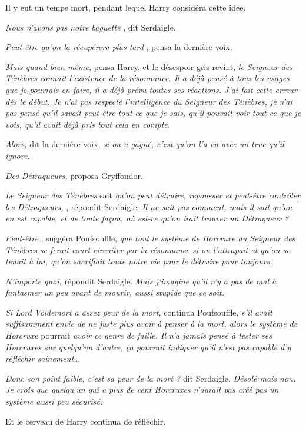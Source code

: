 Il y eut un temps mort, pendant lequel Harry considéra cette idée.

\emph{Nous n'avons pas notre baguette} , dit Serdaigle.

\emph{Peut-être qu'on la récupérera plus tard} , pensa la dernière voix.

\emph{Mais quand bien même,}  pensa Harry, et le désespoir gris revint, \emph{le Seigneur des Ténèbres connait l'existence de la résonnance. Il a déjà pensé à tous les usages que je pourrais en faire, il a déjà prévu toutes ses réactions. J'ai fait cette erreur dès le début. Je n'ai pas respecté l'intelligence du Seigneur des Ténèbres, je n'ai pas pensé qu'il savait peut-être tout ce que je sais, qu'il pouvait voir tout ce que je vois, qu'il avait déjà pris tout cela en compte.} 

\emph{Alors,}  dit la dernière voix, \emph{si on a gagné, c'est qu'on l'a eu avec un truc qu'il ignore.} 

\emph{Des Détraqueurs,}  proposa Gryffondor.

\emph{Le Seigneur des Ténèbres} sait \emph{qu'on peut détruire, repousser et peut-être contrôler les Détraqueurs,} , répondit Serdaigle. \emph{Il ne sait pas comment, mais il sait qu'on en est capable, et de toute façon, où est-ce qu'on irait trouver un Détraqueur ?} 

\emph{Peut-être} , suggéra Poufsouffle, \emph{que tout le système de Horcruxe du Seigneur des Ténèbres se ferait court-circuiter par la résonnance si on l'attrapait et qu'on se tenait à lui, qu'on sacrifiait toute notre vie pour le détruire pour toujours.} 

\emph{N'importe quoi,}  répondit Serdaigle. \emph{Mais j'imagine qu'il n'y a pas de mal à fantasmer un peu avant de mourir, aussi stupide que ce soit.} 

\emph{Si Lord Voldemort a assez peur de la mort,}  continua Poufsouffle, \emph{s'il avait suffisamment envie de ne juste plus avoir à penser à la mort, alors le système de Horcruxe}  pourrait \emph{avoir ce genre de faille. Il n'a jamais pensé à tester ses Horcruxes sur quelqu'un d'autre, ça pourrait indiquer qu'il n'est pas capable d'y réfléchir sainement…} 

\emph{Donc son point faible, c'est sa peur de la mort ?}  dit Serdaigle. \emph{Désolé mais non. Je crois que quelqu'un qui a plus de cent Horcruxes n'aurait pas créé pas un système aussi peu sécurisé.} 

Et le cerveau de Harry continua de réfléchir.

